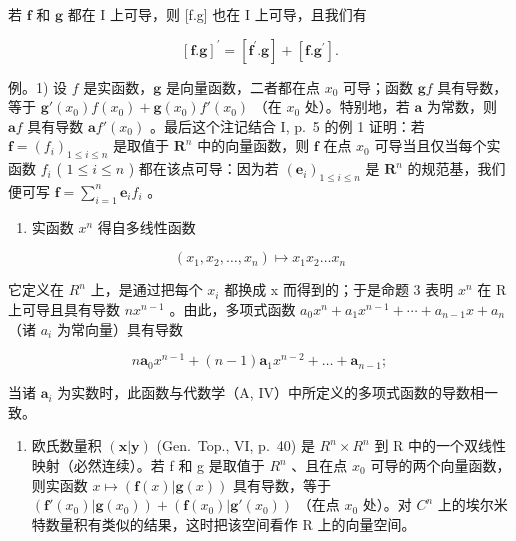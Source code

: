 若 \(\mathbf{f}\) 和 \(\mathbf{g}\) 都在 I 上可导，则 {[}f.g{]} 也在 I 上可导，且我们有

\[
\left[ \mathbf {f}. \mathbf {g} \right] ^ {\prime} = \left[ \mathbf {f} ^ {\prime}. \mathbf {g} \right] + \left[ \mathbf {f}. \mathbf {g} ^ {\prime} \right].\tag{2}
\]

例。1) 设 \(f\) 是实函数，\(\mathbf{g}\) 是向量函数，二者都在点 \(x_0\) 可导；函数 \(\mathbf{g}f\) 具有导数，等于 \(\mathbf{g}'(x_0)f(x_0) + \mathbf{g}(x_0)f'(x_0)\) （在 \(x_0\) 处）。特别地，若 \(\mathbf{a}\) 为常数，则 \(\mathbf{a}f\) 具有导数 \(\mathbf{a}f'(x_0)\) 。最后这个注记结合 I, p.~5 的例 1 证明：若 \(\mathbf{f} = (f_i)_{1 \leqslant i \leqslant n}\) 是取值于 \(\mathbf{R}^n\) 中的向量函数，则 \(\mathbf{f}\) 在点 \(x_0\) 可导当且仅当每个实函数 \(f_i\) ( \(1 \leqslant i \leqslant n\) ) 都在该点可导：因为若 \((\mathbf{e}_i)_{1 \leqslant i \leqslant n}\) 是 \(\mathbf{R}^n\) 的规范基，我们便可写 \(\mathbf{f} = \sum_{i=1}^{n} \mathbf{e}_i f_i\) 。

\begin{enumerate}
\def\labelenumi{\arabic{enumi})}
\setcounter{enumi}{1}
\tightlist
\item
  实函数 \(x^{n}\) 得自多线性函数
\end{enumerate}

\[
(x _ {1}, x _ {2}, \ldots , x _ {n}) \mapsto x _ {1} x _ {2} \ldots x _ {n}
\]

它定义在 \(R^{n}\) 上，是通过把每个 \(x_{i}\) 都换成 x 而得到的；于是命题 3 表明 \(x^{n}\) 在 R 上可导且具有导数 \(nx^{n-1}\) 。由此，多项式函数 \(a_{0}x^{n} + a_{1}x^{n-1} + \cdots + a_{n-1}x + a_{n}\) （诸 \(a_{i}\) 为常向量）具有导数

\[
n \mathbf {a} _ {0} x ^ {n - 1} + (n - 1) \mathbf {a} _ {1} x ^ {n - 2} + \dots + \mathbf {a} _ {n - 1};
\]

当诸 \(\mathbf{a}_i\) 为实数时，此函数与代数学（A, IV）中所定义的多项式函数的导数相一致。

\begin{enumerate}
\def\labelenumi{\arabic{enumi})}
\setcounter{enumi}{2}
\tightlist
\item
  欧氏数量积 \((\mathbf{x}|\mathbf{y})\) (Gen.~Top., VI, p.~40) 是 \(R^{n}\times R^{n}\) 到 R 中的一个双线性映射（必然连续）。若 f 和 g 是取值于 \(R^{n}\) 、且在点 \(x_{0}\) 可导的两个向量函数，则实函数 \(x\mapsto(\mathbf{f}(x)|\mathbf{g}(x))\) 具有导数，等于 \((\mathbf{f}'(x_{0})|\mathbf{g}(x_{0}))+(\mathbf{f}(x_{0})|\mathbf{g}'(x_{0}))\) （在点 \(x_{0}\) 处）。对 \(C^{n}\) 上的埃尔米特数量积有类似的结果，这时把该空间看作 R 上的向量空间。
\end{enumerate}

